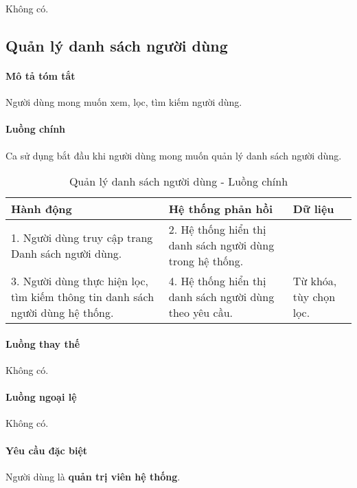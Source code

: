 \documentclass[./../main.tex]{subfiles}
\begin{document}
Không có.

\subsection{Quản lý danh sách người dùng}

\paragraph*{Mô tả tóm tắt}

Người dùng mong muốn xem, lọc, tìm kiếm người dùng.

\paragraph*{Luồng chính} Ca sử dụng bắt đầu khi người dùng mong muốn quản lý danh sách người dùng.

\begin{table}[H]
  \caption{Quản lý danh sách người dùng - Luồng chính}
  \label{tab:orgAdmin_manage_users}
  \begin{tabularx}{\textwidth}{|X|X|X|}
    \hline
    \textbf{Hành động} & \textbf{Hệ thống phản hồi} & \textbf{Dữ liệu} \\ \hline
    1. Người dùng truy cập trang Danh sách người dùng. & 2. Hệ thống hiển thị danh sách người dùng trong hệ thống. &  \\ \hline
    3. Người dùng thực hiện lọc, tìm kiếm thông tin danh sách người dùng hệ thống.  & 4. Hệ thống hiển thị danh sách người dùng theo yêu cầu. & Từ khóa, tùy chọn lọc. \\ \hline
  \end{tabularx}
\end{table}

\paragraph*{Luồng thay thế} Không có.

\paragraph*{Luồng ngoại lệ} Không có.

\paragraph*{Yêu cầu đặc biệt}

Người dùng là \textbf{quản trị viên hệ thống}.
\end{document}
